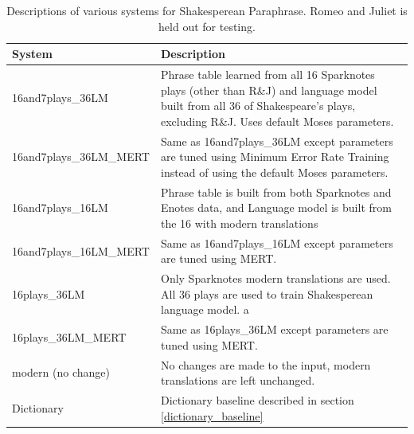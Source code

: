 \documentclass[10pt,a5paper,twoside]{article}
\begin{document}
\begin{table}[ht]
  \begin{center}
    \begin{tabular}{|l|p{3in}|}
      \hline
      System & Description \\
      \hline
      \hline
      16and7plays\_36LM & Phrase table learned from all 16 Sparknotes plays (other than R\&J) and language model built from all 36 of Shakespeare's plays, excluding R\&J.
      Uses default Moses parameters. \\
      \hline
      16and7plays\_36LM\_MERT & Same as 16and7plays\_36LM except parameters are tuned using Minimum Error Rate Training \cite{MERT} instead of using the default Moses parameters.\\
      \hline
      16and7plays\_16LM & Phrase table is built from both Sparknotes and Enotes data, and Language model is built from the 16 with modern translations\\
      \hline
      16and7plays\_16LM\_MERT & Same as 16and7plays\_16LM except parameters are tuned using MERT. \\
      \hline
      16plays\_36LM & Only Sparknotes modern translations are used.  All 36 plays are used to train Shakesperean language model. a\\
      \hline
      16plays\_36LM\_MERT & Same as 16plays\_36LM except parameters are tuned using MERT. \\
      \hline
      modern (no change) & No changes are made to the input, modern translations are left unchanged. \\
      \hline
      Dictionary & Dictionary baseline described in section \ref{dictionary_baseline}\\
      \hline
    \end{tabular}
  \end{center}
  \caption{Descriptions of various systems for Shakesperean Paraphrase.  Romeo and Juliet is held out for testing.}
  \label{systems}
\end{table}
\end{document}
